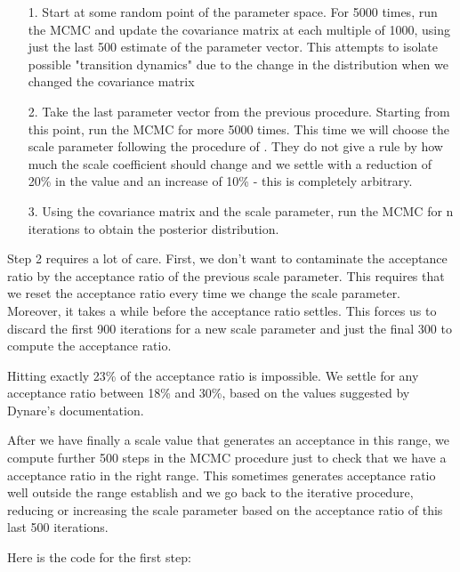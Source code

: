 \documentclass[12pt,a4paper]{article}
\begin{document}
\begin{itemize}
\item[1. ] Start at some random point of the parameter space. For 5000 times, run the MCMC and update the covariance matrix at each multiple of 1000, using just the last 500 estimate of the parameter vector. This attempts to isolate possible "transition dynamics" due to the change in the distribution when we changed the covariance matrix


\item[2. ] Take the last parameter vector from the previous procedure. Starting from this point, run the MCMC for more 5000 times. This time we will choose the scale parameter following the procedure of \cite{Gelman2014}. They do not give a rule by how much the scale coefficient should change and we settle with a reduction of 20\% in the value and an increase of 10\% - this is completely arbitrary.


\item[3. ] Using the covariance matrix and the scale parameter, run the MCMC for n iterations to obtain the posterior distribution.

\end{itemize}
Step 2 requires a lot of care. First, we don't want to contaminate the acceptance ratio by the acceptance ratio of the previous scale parameter. This requires that we reset the acceptance ratio every time we change the scale parameter. Moreover, it takes a while before the acceptance ratio settles. This forces us to discard the first 900 iterations for a new scale parameter and just the final 300 to compute the acceptance ratio.

Hitting exactly 23\% of the acceptance ratio is impossible. We settle for any acceptance ratio between 18\% and 30\%, based on the values suggested by Dynare's documentation.

After we have finally a scale value that generates an acceptance in this range, we compute further 500 steps in the MCMC procedure just to check that we have a acceptance ratio in the right range. This sometimes generates acceptance ratio well outside the range establish and we go back to the iterative procedure, reducing or increasing the scale parameter based on the acceptance ratio of this last 500 iterations.

Here is the code for the first step:
\end{document}
